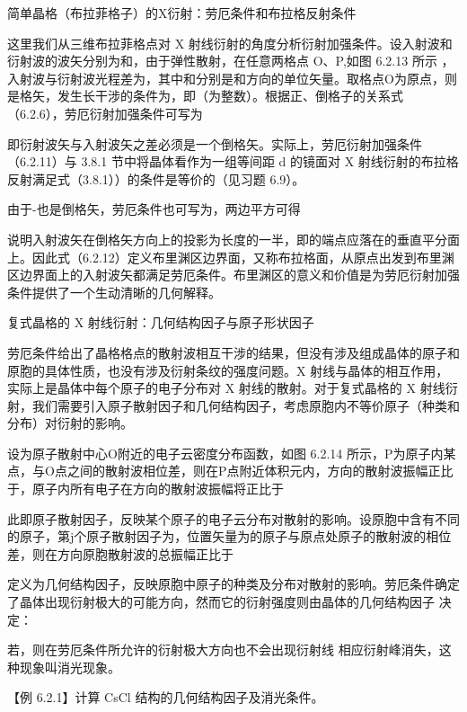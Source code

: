 简单晶格（布拉菲格子）的X衍射：劳厄条件和布拉格反射条件

这里我们从三维布拉菲格点对 X 射线衍射的角度分析衍射加强条件。设入射波和衍射波的波矢分别为和，由于弹性散射，在任意两格点 O、P,如图 6.2.13 所示 ，入射波与衍射波光程差为，其中和分别是和方向的单位矢量。取格点O为原点，则是格矢，发生长干涉的条件为，即（为整数）。根据正、倒格子的关系式（6.2.6），劳厄衍射加强条件可写为



即衍射波矢与入射波矢之差必须是一个倒格矢。实际上，劳厄衍射加强条件（6.2.11）与 3.8.1 节中将晶体看作为一组等间距 d 的镜面对 X 射线衍射的布拉格反射满足式（3.8.1））的条件是等价的（见习题 6.9）。

由于-也是倒格矢，劳厄条件也可写为，两边平方可得



说明入射波矢在倒格矢方向上的投影为长度的一半，即的端点应落在的垂直平分面上。因此式（6.2.12）定义布里渊区边界面，又称布拉格面，从原点出发到布里渊区边界面上的入射波矢都满足劳厄条件。布里渊区的意义和价值是为劳厄衍射加强条件提供了一个生动清晰的几何解释。





    复式晶格的 X 射线衍射：几何结构因子与原子形状因子

劳厄条件给出了晶格格点的散射波相互干涉的结果，但没有涉及组成晶体的原子和原胞的具体性质，也没有涉及衍射条纹的强度问题。X 射线与晶体的相互作用，实际上是晶体中每个原子的电子分布对 X 射线的散射。对于复式晶格的 X 射线衍射，我们需要引入原子散射因子和几何结构因子，考虑原胞内不等价原子（种类和分布）对衍射的影响。

设为原子散射中心O附近的电子云密度分布函数，如图 6.2.14 所示，P为原子内某点，与O点之间的散射波相位差，则在P点附近体积元内，方向的散射波振幅正比于，原子内所有电子在方向的散射波振幅将正比于



此即原子散射因子，反映某个原子的电子云分布对散射的影响。设原胞中含有不同的原子，第j个原子散射因子为，位置矢量为的原子与原点处原子的散射波的相位差，则在方向原胞散射波的总振幅正比于



定义为几何结构因子，反映原胞中原子的种类及分布对散射的影响。劳厄条件确定了晶体出现衍射极大的可能方向，然而它的衍射强度则由晶体的几何结构因子 决定：



若，则在劳厄条件所允许的衍射极大方向也不会出现衍射线 相应衍射峰消失，这种现象叫消光现象。

【例 6.2.1】计算 CsCl 结构的几何结构因子及消光条件。

